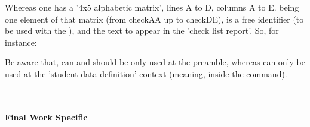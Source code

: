 \documentclass[article,nogeometry,english,tocdepth=3,secdepth=3]{ufrgscca} %
\begin{document}
\begin{codedescribe}{\checkdef}%
\begin{codesyntax}%
\end{codesyntax}
Whereas one has a '4x5 alphabetic matrix', lines A to D, columns A to E.  being one element of that matrix (from checkAA up to checkDE),  is a free identifier (to be used with the \tsmacro{\checklist}{}), and  the text to appear in the 'check list report'.  So, for instance:

\begin{codestore}[st=d.check]


\end{codestore}



Be aware that, \tsmacro{\checkdef}{} can and should be only used at the preamble, whereas \tsmacro{\checklist}{} can only be used at the 'student data definition' context (meaning, inside the \tsmacro{\NewStudent}{} command).
\end{codedescribe}\\


\paragraph{Final Work Specific}
\end{document}
